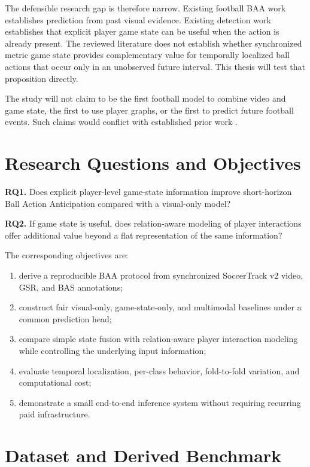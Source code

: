 \documentclass[11pt,a4paper]{article}
\begin{document}
The defensible research gap is therefore narrow. Existing football BAA work establishes prediction from past visual evidence. Existing detection work establishes that explicit player game state can be useful when the action is already present. The reviewed literature does not establish whether synchronized metric game state provides complementary value for temporally localized ball actions that occur only in an unobserved future interval. This thesis will test that proposition directly.

The study will not claim to be the first football model to combine video and game state, the first to use player graphs, or the first to predict future football events. Such claims would conflict with established prior work \cite{ochin2025gs,ochin2025beyond}.

\section{Research Questions and Objectives}

\textbf{RQ1.} Does explicit player-level game-state information improve short-horizon Ball Action Anticipation compared with a visual-only model?

\textbf{RQ2.} If game state is useful, does relation-aware modeling of player interactions offer additional value beyond a flat representation of the same information?

The corresponding objectives are:

\begin{enumerate}[label=\arabic*.]
\item derive a reproducible BAA protocol from synchronized SoccerTrack v2 video, GSR, and BAS annotations;
\item construct fair visual-only, game-state-only, and multimodal baselines under a common prediction head;
\item compare simple state fusion with relation-aware player interaction modeling while controlling the underlying input information;
\item evaluate temporal localization, per-class behavior, fold-to-fold variation, and computational cost;
\item demonstrate a small end-to-end inference system without requiring recurring paid infrastructure.
\end{enumerate}

\section{Dataset and Derived Benchmark}
\end{document}
